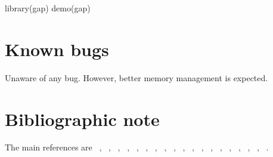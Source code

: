 \documentclass[11pt,a4paper]{article}
\begin{document}
\begin{Schunk}
\begin{Scode}
library(gap)
demo(gap)
\end{Scode}
\end{Schunk}

\section{Known bugs}

Unaware of any bug. However, better memory management is expected.

\section{Bibliographic note}

The main references are ~\cite{chow60}, ~\cite{guo92}, ~\cite{wcn92}, ~\cite{gholamic94},
~\cite{risch96}, ~\cite{spielman96}, ~\cite{risch97}, ~\cite{miller97}, ~\cite{sham97}, 
~\cite{sham98}, ~\cite{devlin99}, ~\cite{zhao99}, ~\cite{guo00}, 
~\cite{hirotsu01}, ~\cite{zhao02}, ~\cite{zaykin02}, ~\cite{zhao04}, ~\cite{wang05},
~\cite{skol06}.


\end{document}
